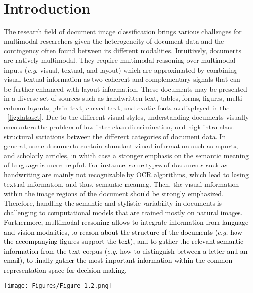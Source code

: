 \documentclass[preprint,review,12pt]{elsarticle}
\newcommand{\eg}{\textit{e.g. }}
\begin{document}
\section{Introduction}
\label{sec:introduction}

The research field of document image classification brings various challenges for multimodal researchers given the heterogeneity of document data and the contingency often found between its different modalities. Intuitively, documents are natively multimodal. They require multimodal reasoning over multimodal inputs (\eg visual, textual, and layout) which are approximated by combining visual-textual information as two coherent and complementary signals that can be further enhanced with layout information. These documents may be presented in a diverse set of sources such as handwritten text, tables, forms, figures, multi-column layouts, plain text, curved text, and exotic fonts as displayed in the \figurename~\ref{fig:dataset}. Due to the different visual styles, understanding documents visually encounters the problem of low inter-class discrimination, and high intra-class structural variations between the different categories of document data. In general, some documents contain abundant visual information such as reports, and scholarly articles, in which case a stronger emphasis on the semantic meaning of language is more helpful. For instance, some types of documents such as handwriting are mainly not recognizable by OCR algorithms, which lead to losing textual information, and thus, semantic meaning. Then, the visual information within the image regions of the document should be strongly emphasized. Therefore, handling the semantic and stylistic variability in documents is challenging to computational models that are trained mostly on natural images. \textcolor{black}{Furthermore, multimodal reasoning allows to integrate information from language and vision modalities, to reason about the structure of the documents (\eg how the accompanying figures support the text), and to gather the relevant semantic information from the text corpus (\eg how to distinguish between a letter and an email), to finally gather the most important information within the common representation space for decision-making.} 
\begin{figure*}[t!]
\centering
  \centerline{\texttt{[image: Figures/Figure\_1.2.png]}}
    \caption{\textcolor{black}{Document samples from the categories of the RVL-CDIP dataset which show the high intra-class structural variability and low inter-class discrimination between the different categories of document data. Samples from different classes are shown with a red border, while samples from the same class are shown with green border.}}
    \label{fig:dataset}
\end{figure*}
\end{document}
